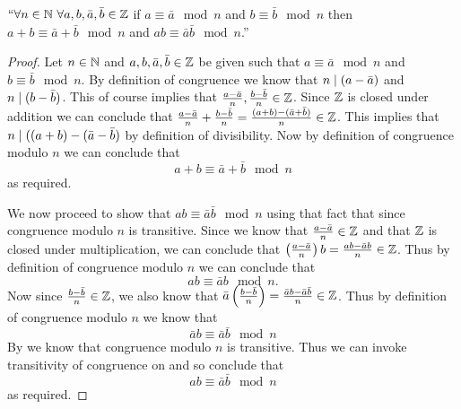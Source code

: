         \begin{lemma}
            $``\forall n \in \mathbb{N} \ \forall a, b, \bar{a}, \bar{b} \in \mathbb{Z}$
            if $a \equiv \bar{a} \mod n$ and $b \equiv \bar{b} \mod n$ then
            $a + b \equiv \bar{a} + \bar{b} \mod n$ and $ab \equiv \bar{a}\bar{b} \mod n$.''
        \end{lemma}
        \begin{proof}
            Let $n \in \mathbb{N}$ and $a, b, \bar{a}, \bar{b} \in \mathbb{Z}$ be given such
            that $a \equiv \bar{a} \mod n$ and $b \equiv \bar{b} \mod n$. By definition 
            of congruence we know that $n \mid (a - \bar{a})$ and $n \mid (b - \bar{b})$.
            This of course implies that $\frac{a - \bar{a}}{n}, \frac{b - \bar{b}}{n} \in \mathbb{Z}$.
            Since $\mathbb{Z}$ is closed under addition we can conclude that
            $\frac{a - \bar{a}}{n} + \frac{b - \bar{b}}{n} = \frac{(a + b) - (\bar{a} + \bar{b})}{n} \in \mathbb{Z}$.
            This implies that $n \mid ((a + b) - (\bar{a} - \bar{b})$ by definition of divisibility.
            Now by definition of congruence modulo $n$ we can conclude that 
            \[
                a + b \equiv \bar{a} + \bar{b} \mod n
            \]
            as required.

            We now proceed to show that $ab \equiv \bar{a}\bar{b} \mod n$ using that fact
            that since congruence modulo $n$ is transitive. Since we know that $\frac{a - \bar{a}}{n} \in \mathbb{Z}$
            and that $\mathbb{Z}$ is closed under multiplication, we can conclude that
            $\left(\frac{a - \bar{a}}{n}\right)b = \frac{ab - \bar{a}b}{n} \in \mathbb{Z}$.
            Thus by definition of congruence modulo $n$ we can conclude that
            \begin{equation}
                ab \equiv \bar{a}b \mod n.
                \label{Modular Arithmetic equation 1}
            \end{equation}
            Now since $\frac{b - \bar{b}}{n} \in \mathbb{Z}$, we also know that
            $\bar{a}\left(\frac{b - \bar{b}}{n}\right) = \frac{\bar{a}b - \bar{a}\bar{b}}{n} \in \mathbb{Z}$.
            Thus by definition of congruence modulo $n$ we know that
            \begin{equation}
                \bar{a}b \equiv \bar{a}\bar{b} \mod n
                \label{Modular Arithmetic equation 2}
            \end{equation}
            By  we know that congruence modulo $n$
            is transitive. Thus we can invoke transitivity of congruence on
             and 
            so conclude that
            \[
                ab \equiv \bar{a}\bar{b} \mod n
            \]
            as required. \QED
        \end{proof}
